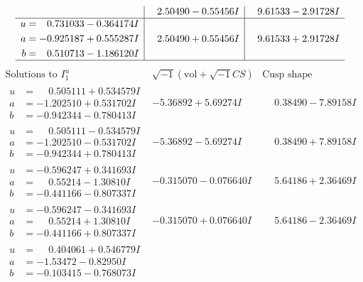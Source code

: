 \documentclass[1p]{elsarticle_modified}
\theoremstyle{definition}
\newcommand{\I}{\sqrt{-1}}
\begin{document}
$$\begin{array}{c|c|c}
 & \phantom{-}2.50490 - 0.55456 I & \phantom{-}9.61533 - 2.91728 I \\ \hline\begin{aligned}
u &= \phantom{-}0.731033 - 0.364174 I \\
a &= -0.925187 + 0.555287 I \\
b &= \phantom{-}0.510713 - 1.186120 I\end{aligned}
 & \phantom{-}2.50490 + 0.55456 I & \phantom{-}9.61533 + 2.91728 I\\
 \hline 
 \end{array}$$\newpage$$\begin{array}{c|c|c}  
\text{Solutions to }I^u_{1}& \I (\text{vol} + \sqrt{-1}CS) & \text{Cusp shape}\\
 \hline 
\begin{aligned}
u &= \phantom{-}0.505111 + 0.534579 I \\
a &= -1.202510 + 0.531702 I \\
b &= -0.942344 - 0.780413 I\end{aligned}
 & -5.36892 + 5.69274 I & \phantom{-}0.38490 - 7.89158 I \\ \hline\begin{aligned}
u &= \phantom{-}0.505111 - 0.534579 I \\
a &= -1.202510 - 0.531702 I \\
b &= -0.942344 + 0.780413 I\end{aligned}
 & -5.36892 - 5.69274 I & \phantom{-}0.38490 + 7.89158 I \\ \hline\begin{aligned}
u &= -0.596247 + 0.341693 I \\
a &= \phantom{-}0.55214 - 1.30810 I \\
b &= -0.441166 - 0.807337 I\end{aligned}
 & -0.315070 - 0.076640 I & \phantom{-}5.64186 + 2.36469 I \\ \hline\begin{aligned}
u &= -0.596247 - 0.341693 I \\
a &= \phantom{-}0.55214 + 1.30810 I \\
b &= -0.441166 + 0.807337 I\end{aligned}
 & -0.315070 + 0.076640 I & \phantom{-}5.64186 - 2.36469 I \\ \hline\begin{aligned}
u &= \phantom{-}0.404061 + 0.546779 I \\
a &= -1.53472 - 0.82950 I \\
b &= -0.103415 - 0.768073 I\end{aligned}

\end{array}$$
\end{document}
